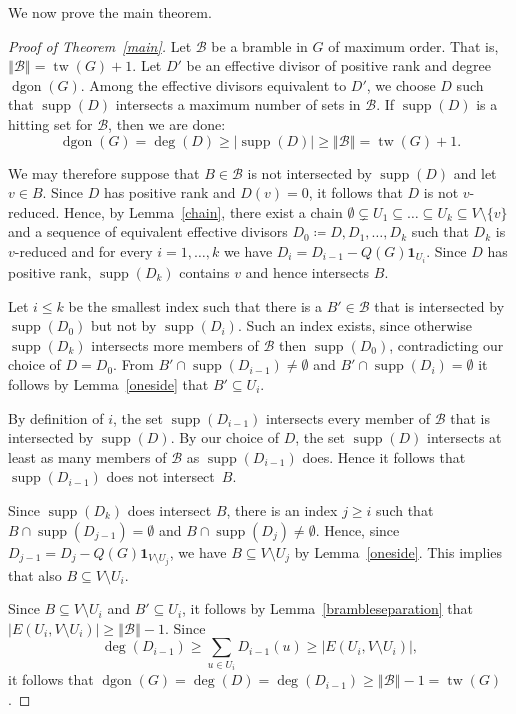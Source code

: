 \documentclass[10pt]{amsart}
\newcommand{\one}{\ensuremath{\mathbf{1}}}
\DeclareMathOperator{\tw}{tw}
\DeclareMathOperator{\dgon}{dgon}
\DeclareMathOperator{\supp}{supp}
\newcommand*{\B}{\mathcal{B}}
\newcommand*{\order}[1]{\left\Vert#1\right\Vert}
\begin{document}
\noindent We now prove the main theorem.
\begin{proof}[Proof of Theorem~\ref{main}]
Let $\B$ be a bramble in $G$ of maximum order. That is, $\order{\B} = \tw(G)+1$. Let $D'$ be an effective divisor of positive rank and degree $\dgon(G)$. Among the effective divisors equivalent to $D'$, we choose $D$ such that $\supp(D)$ intersects a maximum number of sets in $\B$. If $\supp(D)$ is a hitting set for $\B$, then we are done:
\begin{equation}
\dgon(G)=\deg(D) \geq |\supp(D)| \geq \order{\B} = \tw(G)+1.
\end{equation}

We may therefore suppose that $B\in\B$ is not intersected by $\supp(D)$ and let $v\in B$. Since $D$ has positive rank and $D(v)=0$, it follows that $D$ is not $v$-reduced. Hence, by Lemma~\ref{chain}, there exist a chain $\emptyset\subsetneq U_1\subseteq\ldots\subseteq U_k\subseteq V\setminus{\{v\}}$ and a sequence of equivalent effective divisors $D_0\coloneqq D,D_1,\ldots,D_k$ such that $D_k$ is $v$-reduced and for every $i=1,\ldots, k$ we have $D_i=D_{i-1}-Q(G)\one_{U_i}$. Since $D$ has positive rank, $\supp(D_k)$ contains $v$ and hence intersects $B$.

Let $i\leq k$ be the smallest index such that there is a $B'\in \B$ that is intersected by $\supp(D_0)$ but not by $\supp(D_i)$. Such an index exists, since otherwise $\supp(D_k)$ intersects more members of $\B$ then $\supp(D_0)$, contradicting our choice of $D=D_0$. From $B'\cap \supp(D_{i-1})\neq \emptyset$ and $B'\cap \supp(D_{i})=\emptyset$ it follows by Lemma~\ref{oneside} that $B'\subseteq U_i$. 

By definition of $i$, the set $\supp(D_{i-1})$ intersects every member of $\B$ that is intersected by $\supp(D)$. By our choice of $D$, the set $\supp(D)$ intersects at least as many members of $\B$ as $\supp(D_{i-1})$ does. Hence it follows that $\supp(D_{i-1})$ does not intersect~$B$. 

Since $\supp(D_k)$ does intersect $B$, there is an index $j\geq i$ such that $B\cap \supp(D_{j-1})=\emptyset$ and $B\cap \supp(D_{j})\neq\emptyset$. Hence, since $D_{j-1}=D_j-Q(G)\one_{V\setminus U_j}$, we have $B\subseteq V\setminus U_j$ by Lemma~\ref{oneside}. This implies that also $B\subseteq V\setminus U_i$. 

Since $B\subseteq V\setminus U_i$ and $B'\subseteq U_i$, it follows by Lemma~\ref{brambleseparation} that $|E(U_i,V\setminus U_i)|\geq \order{\B}-1$. Since 
\begin{equation}
\deg (D_{i-1})\geq \sum_{u\in U_i}D_{i-1}(u)\geq |E(U_i,V\setminus U_i)|,
\end{equation}
it follows that $\dgon(G)=\deg(D) = \deg(D_{i-1}) \geq \order{\B} - 1 = \tw(G)$.
\end{proof}
\end{document}
